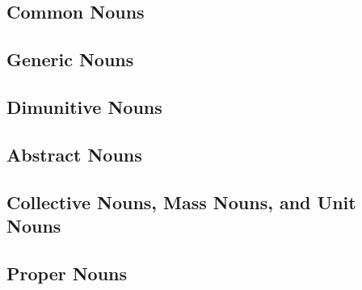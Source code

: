 \documentclass[grammar]{subfiles}
\begin{document}
\tbw

\subsection{Common Nouns}
\label{ssec:dev_common_nouns}

\tbw

\subsection{Generic Nouns}
\label{ssec:dev_generic_nouns}

\tbw

\subsection{Dimunitive Nouns}
\label{ssec:dev_dimunitive_nouns}

\tbw

\subsection{Abstract Nouns}
\label{ssec:dev_abstract_nouns}

\tbw

\subsection{Collective Nouns, Mass Nouns, and Unit Nouns}
\label{ssec:dev_collective_mass_unit}

\tbw

\subsection{Proper Nouns}
\label{ssec:dev_proper_nouns}

\tbw
\end{document}
